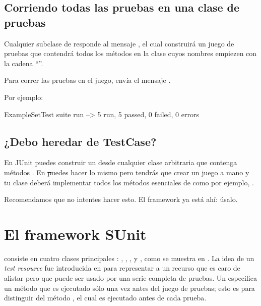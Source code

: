 \documentclass[a4paper,10pt,twoside]{book}
\begin{document}
\subsection{Corriendo todas las pruebas en una clase de pruebas}

Cualquier subclase de  responde al mensaje , el cual
construir\'a un juego de pruebas que contendr\'a todos los
m\'etodos en la clase cuyos nombres empiezen con la cadena ``''.

Para correr las pruebas en el juego, env\'ia el mensaje .

Por ejemplo:

\begin{code}{}
ExampleSetTest suite run --> 5 run, 5 passed, 0 failed, 0 errors
\end{code}

\subsection{¿Debo heredar de TestCase?}

En JUnit{} puedes construir un  desde cualquier clase arbitraria
que contenga m\'etodos . En \st puedes hacer lo mismo pero tendr\'as
que crear un juego a mano y tu clase deber\'a implementar todos los m\'etodos esenciales de 
  como por ejemplo, .

Recomendamos que no intentes hacer esto. El framework ya est\'a ah\'i: \'usalo.


\section{El framework SUnit}

\sunit consiste en cuatro clases principales : ,
, , y , como se muestra en .
La idea de un \emph{test resource} fue introducida en  para representar a un recurso
que es caro de alistar pero que puede ser usado por una serie completa de pruebas.  Un 
especifica un m\'etodo  que es ejecutado s\'olo una vez antes del juego de pruebas;
esto es para distinguir del m\'etodo , el cual es ejecutado antes de cada prueba. 
\end{document}

